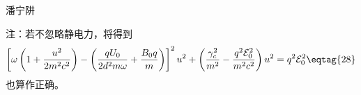 \documentclass[answer]{cphos}
\begin{document}
\begin{problem}[40]{潘宁阱}
\begin{solution}
注：若不忽略静电力，将得到
\begin{equation}
	\left[\omega\left(1+\frac{u^2}{2m^2c^2}\right) - \left(\frac{qU_0}{2d^2m\omega}+\frac{B_0 q}{m}\right)\right] ^2 u^2 + \left(\frac{\gamma_c ^2}{m^2}-\frac{q^2\mathcal{E}_0^2}{m^2c^2}\right) u^2 = q^2 \mathcal{E}_0 ^2\eqtag{28}
\end{equation}
也算作正确。



\scoring  %
\end{solution}
	
\end{problem}
\end{document}
